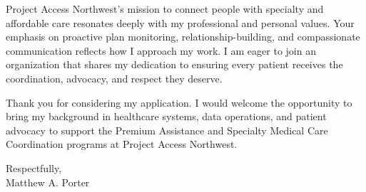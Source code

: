 \documentclass[11pt, a4paper]{cv}
\begin{document}
\begin{cvletter}
Project Access Northwest’s mission to connect people with specialty and affordable care resonates deeply with my professional and personal values. Your emphasis on proactive plan monitoring, relationship-building, and compassionate communication reflects how I approach my work. I am eager to join an organization that shares my dedication to ensuring every patient receives the coordination, advocacy, and respect they deserve.

Thank you for considering my application. I would welcome the opportunity to bring my background in healthcare systems, data operations, and patient advocacy to support the Premium Assistance and Specialty Medical Care Coordination programs at Project Access Northwest.

\end{cvletter}


\makeletterclosing
\vspace{2em}
\noindent
Respectfully,\\[1.5em]
Matthew A. Porter
\end{document}

